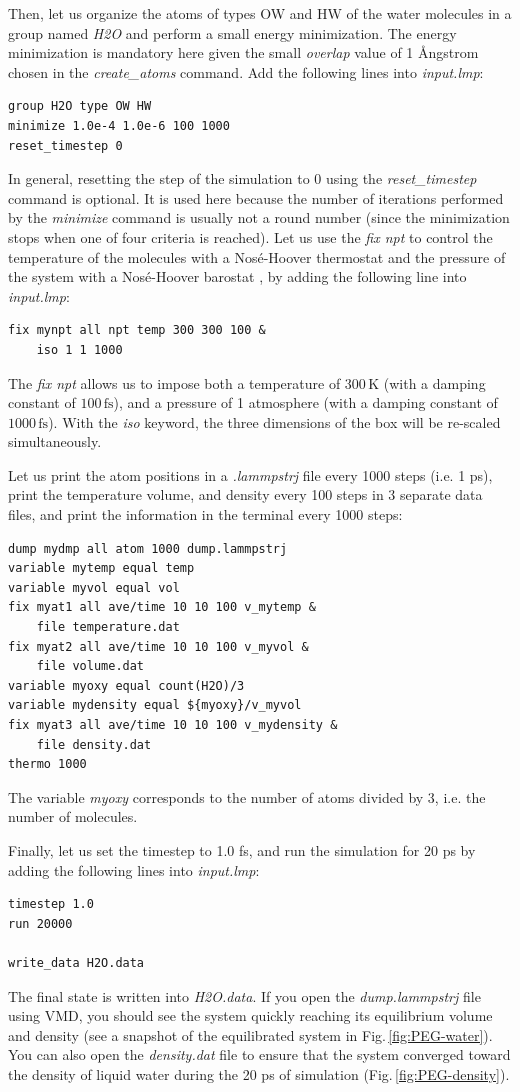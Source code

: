 \documentclass[9pt,tutorial]{livecoms}
\begin{document}
Then, let us organize the atoms of types OW and HW of the water molecules in a
group named \textit{H2O} and perform a small energy minimization. The energy
minimization is mandatory here given the small \textit{overlap} value of 1 Ångstrom
chosen in the \textit{create\_atoms} command. Add the following lines into \textit{input.lmp}:
{\normalsize \begin{verbatim}
group H2O type OW HW
minimize 1.0e-4 1.0e-6 100 1000
reset_timestep 0
\end{verbatim}}
In general, resetting the step of the simulation to 0 using the
\textit{reset\_timestep} command is optional.
It is used here because the number of iterations performed by the \textit{minimize}
command is usually not a round number (since the minimization stops when one of
four criteria is reached). Let us use the \textit{fix npt} to control the temperature
of the molecules with a Nosé-Hoover thermostat and the pressure of the system with
a Nosé-Hoover barostat \cite{nose1984unified, hoover1985canonical, martyna1994constant},
by adding the following line into \textit{input.lmp}:
{\normalsize \begin{verbatim}
fix mynpt all npt temp 300 300 100 &
    iso 1 1 1000
\end{verbatim}}
The \textit{fix npt} allows us to impose both a temperature of $300\,\text{K}$
(with a damping constant of $100\,\text{fs}$), and a pressure of 1 atmosphere
(with a damping constant of $1000\,\text{fs}$). With the \textit{iso} keyword,
the three dimensions of the box will be re-scaled simultaneously.

Let us print the atom positions in a \textit{.lammpstrj} file every 1000 steps
(i.e. 1 ps), print the temperature volume, and density every 100 steps in 3
separate data files, and print the information in the terminal every 1000 steps:
{\normalsize \begin{verbatim}
dump mydmp all atom 1000 dump.lammpstrj
variable mytemp equal temp
variable myvol equal vol
fix myat1 all ave/time 10 10 100 v_mytemp &
    file temperature.dat
fix myat2 all ave/time 10 10 100 v_myvol &
    file volume.dat
variable myoxy equal count(H2O)/3
variable mydensity equal ${myoxy}/v_myvol
fix myat3 all ave/time 10 10 100 v_mydensity &
    file density.dat
thermo 1000
\end{verbatim}}
The variable \textit{myoxy} corresponds to the number of atoms divided by 3, i.e.
the number of molecules.

Finally, let us set the timestep to 1.0 fs, and run the simulation for 20 ps by
adding the following lines into \textit{input.lmp}:
{\normalsize \begin{verbatim}
timestep 1.0
run 20000

write_data H2O.data
\end{verbatim}}
The final state is written into \textit{H2O.data}. If you open the \textit{dump.lammpstrj}
file using VMD, you should see the system quickly reaching its equilibrium volume
and density (see a snapshot of the equilibrated system in Fig.\,\ref{fig:PEG-water}).
You can also open the \textit{density.dat} file to ensure that the system converged
toward the density of liquid water during the 20 ps of simulation (Fig.\,\ref{fig:PEG-density}).
\end{document}
